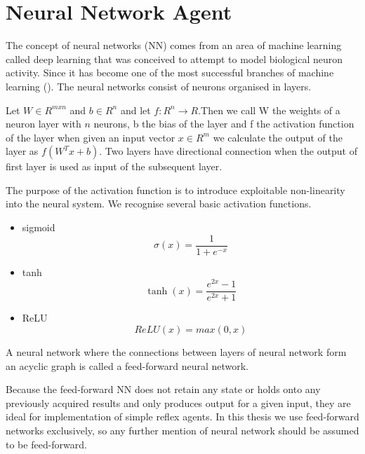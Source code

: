 \section{Neural Network Agent}
The concept of neural networks (NN) comes from an area of machine learning called deep learning that was conceived to attempt to model biological neuron activity. Since it has become one of the most successful branches of machine learning (\cite{russell2021}).  
The neural networks consist of neurons organised in layers.
\begin{defn}
Let $ W \in R^{m x n} $ and $ b\in R^{n}$ and let $ f:R^{n} \rightarrow R$.Then we call W the weights of a neuron layer with $ n $ neurons, b the bias of the layer and f the activation function of the layer when given an input vector $ x \in R^{m} $ we calculate the output of the layer as $ f(W^{T}x+b)$. Two layers have directional connection when the output of first layer is used as input of the subsequent layer.
\end{defn}
The purpose of the activation function is to introduce exploitable non-linearity into the neural system. We recognise several basic activation functions.
\begin{itemize}
\item sigmoid
$$ \sigma (x) = \frac{1}{1+e^{-x}} $$
\item tanh
$$ \tanh(x) = \frac{e^{2x}-1}{e^{2x}+1} $$
\item ReLU
$$ ReLU (x) = max(0,x) $$
\end{itemize}
\begin{defn}  
A neural network where the connections between layers of neural network form an acyclic graph is called a feed-forward neural network.
\end{defn}
Because the feed-forward NN does not retain any state or holds onto any previously acquired results and only produces output for a given input, they are ideal for implementation of simple reflex agents. In this thesis we use feed-forward networks exclusively, so any further mention of neural network should be assumed to be feed-forward.









